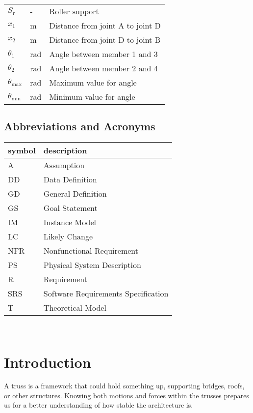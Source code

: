 \documentclass[12pt]{article}
\begin{document}
\begin{longtable*}{l l p{12cm}}
$S_\text{r}$ & - & Roller support \\
$x_\text{1}$ & \si{\meter} & Distance from joint A to joint D \\
$x_\text{2}$ & \si{\meter} & Distance from joint D to joint B \\
$\theta_\text{1}$ & \si{\radian} & Angle between member 1 and 3 \\
$\theta_\text{2}$ & \si{\radian} & Angle between member 2 and 4 \\
$\theta_{\text{max}}$ & \si{\radian} & Maximum value for angle \\
$\theta_{\text{min}}$ & \si{\radian} & Minimum value for angle \\
\bottomrule
\end{longtable*}

\subsection{Abbreviations and Acronyms}

\renewcommand{\arraystretch}{1.2}
\begin{tabular}{l l} 
  \toprule		
  \textbf{symbol} & \textbf{description}\\
  \midrule 
  A & Assumption\\
  DD & Data Definition\\
  GD & General Definition\\
  GS & Goal Statement\\
  IM & Instance Model\\
  LC & Likely Change\\
  NFR & Nonfunctional Requirement\\
  PS & Physical System Description\\
  R & Requirement\\
  SRS & Software Requirements Specification\\
  T & Theoretical Model\\
  \bottomrule
\end{tabular}\\


\newpage


\section{Introduction}
A truss is a framework that could hold something up, supporting bridges, roofs, 
or other structures. Knowing both motions and forces within the trusses 
prepares us for a better understanding of how stable the architecture 
is. 
\end{document}
